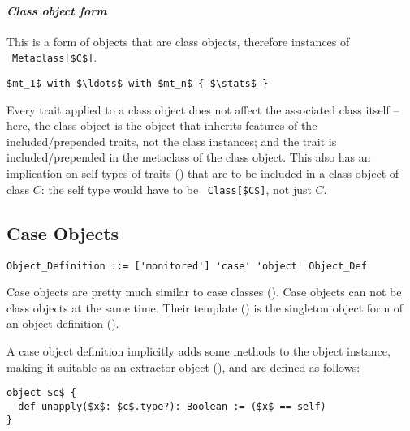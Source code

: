 \paragraph{\em Class object form}
This is a form of objects that are class objects, therefore instances of ~\lstinline!Metaclass[$C$]!. 
\begin{lstlisting}
$mt_1$ with $\ldots$ with $mt_n$ { $\stats$ }
\end{lstlisting}

Every trait applied to a class object does not affect the associated class itself -- here, the class object is the object that inherits features of the included/prepended traits, not the class instances; and the trait is included/prepended in the metaclass of the class object. This also has an implication on self types of traits () that are to be included in a class object of class $C$: the self type would have to be ~\lstinline!Class[$C$]!, not just $C$. 






\subsection{Case Objects}
\label{sec:case-objects}

\grammar\begin{lstlisting}
Object_Definition ::= ['monitored'] 'case' 'object' Object_Def
\end{lstlisting}

Case objects are pretty much similar to case classes (). Case objects can not be class objects at the same time. Their template () is the singleton object form of an object definition (). 

A case object definition implicitly adds some methods to the object instance, making it suitable as an extractor object (), and are defined as follows:
\begin{lstlisting}
object $c$ {
  def unapply($x$: $c$.type?): Boolean := ($x$ == self)
}
\end{lstlisting}






